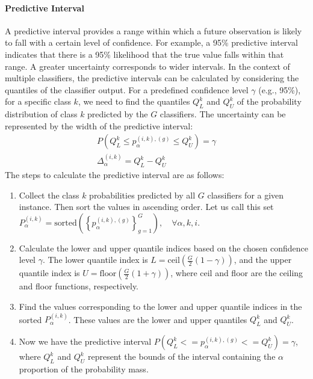 \paragraph{Predictive Interval}
A predictive interval provides a range within which a future observation is likely to fall with a certain level of confidence. For example, a 95\% predictive interval indicates that there is a 95\% likelihood that the true value falls within that range. A greater uncertainty corresponds to wider intervals. In the context of multiple classifiers, the predictive intervals can be calculated by considering the quantiles of the classifier output. For a predefined confidence level $\gamma $ (e.g., 95\%), for a specific class $k $, we need to find the quantiles $Q_{L}^{k} $ and $Q_{U}^{k} $ of the probability distribution of class $k $ predicted by the $G $ classifiers. The uncertainty can be represented by the width of the predictive interval:
\begin{equation}
    \begin{aligned}
        P\left(Q_L^{k} \leq p_{\alpha}^{(i,k),(g)} \leq Q_U^{k}\right) = \gamma
        \\
        \Delta_{\alpha}^{(i,k)} = Q_L^{k} - Q_U^{k}
    \end{aligned}
    \label{eq:crowd.Eq.uncertainty}
\end{equation}
The steps to calculate the predictive interval are as follows:
\begin{enumerate}
    \item Collect the class $k $ probabilities predicted by all $G$ classifiers for a given instance. Then sort the values in ascending order. Let us call this set $P_{\alpha}^{(i,k)}=\mathrm{sorted}\left(\left\{p_{\alpha}^{(i,k),(g)}\right\}_{g=1}^G\right),\quad\forall \alpha,k,i $.
    \item Calculate the lower and upper quantile indices based on the chosen confidence level $\gamma $. The lower quantile index is $L=\mathrm{ceil}\left(\frac{G}{2}\left(1-\gamma\right)\right) $, and the upper quantile index is $U=\mathrm{floor}\left(\frac{G}{2} (1+\gamma)\right) $, where ceil and floor are the ceiling and floor functions, respectively.
    \item Find the values corresponding to the lower and upper quantile indices in the sorted $P_{\alpha}^{(i,k)} $. These values are the lower and upper quantiles $Q_L^{k} $ and $Q_U^{k} $.
    \item Now we have the predictive interval $P\left(Q_L^{k}<=p_{\alpha}^{(i,k),(g)}<=Q_U^{k}\right)=\gamma $, where $Q_L^{k} $ and $Q_U^{k} $ represent the bounds of the interval containing the $\alpha$ proportion of the probability mass.
\end{enumerate}
